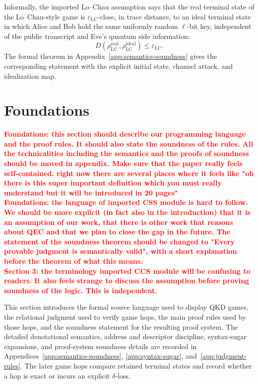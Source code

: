 \documentclass[conference,compsoc]{IEEEtran}
\begin{document}
Informally, the imported Lo--Chau assumption says that the real terminal state of the Lo--Chau-style game is \(\varepsilon_{\mathrm{LC}}\)-close, in trace distance, to an ideal terminal state in which Alice and Bob hold the same uniformly random \(\ell\)-bit key, independent of the public transcript and Eve's quantum side information:
\[
D(\rho^{\mathrm{real}}_{\mathrm{LC}},\rho^{\mathrm{ideal}}_{\mathrm{LC}})
\le
\varepsilon_{\mathrm{LC}} .
\]
The formal theorem in Appendix~\ref{app:semantics-soundness} gives the corresponding statement with the explicit initial state, channel attack, and idealization map.


\section{Foundations}
\label{sec:threat-model}
\label{sec:foundations}

\textbf{\textcolor{red}{Foundations: this section should describe our programming language and  the proof rules. It should also state the soundness of the rules. All the technicalities including the semantics and the proofs of soundness should be moved in appendix. Make sure that the paper really feels self-contained. right now there are several places where it feels like "oh there is this super important definition which you must really understand but it will be introduced in 20 pages"
\\
 Foundations: the language of imported CSS module is hard to follow. We should be more explicit (in fact also in the introduction) that it is an assumption of our work, that there is other work that reasons about QEC and that we plan to close the gap in the future. The statement of the soundness theorem should be changed to "Every provable judgment is semantically valid", with a short explanation before the theorem of what this means.
\\
Section 3: the terminology imported CCS module will be confusing to readers. It also feels strange to discuss the assumption before proving soundness of the logic. This is independent.
}}

This section introduces the formal source language used to display QKD games,
the relational judgment used to verify game hops, the main proof rules used by
those hops, and the soundness statement for the resulting proof system. The
detailed denotational semantics, address and descriptor discipline,
syntax-sugar expansions, and proof-system soundness details are recorded in
Appendices~\ref{app:semantics-soundness}, \ref{app:syntax-sugar},
and~\ref{app:judgment-rules}. The later game hops compare retained terminal
states and record whether a hop is exact or incurs an explicit \(\delta\)-loss.
\end{document}
